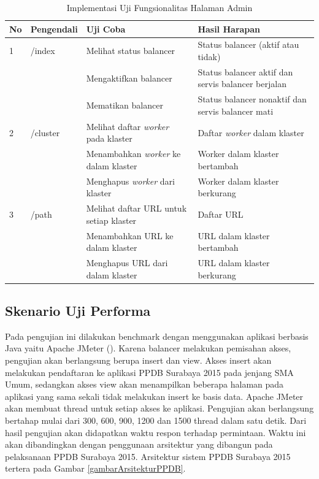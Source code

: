 \documentclass{ta-its}
\begin{document}
				\begin{longtable}{|p{}|p{}|p{}|p{}|} %
					
					\caption{Implementasi Uji Fungsionalitas Halaman Admin} \label{tabelUjiFungsionalitas} \\
					\hline
					\textbf{No} & \textbf{Pengendali} & \textbf{Uji Coba} & \textbf{Hasil Harapan} \\ \hline
					
					\endhead
					\endfoot
					\endlastfoot
					
					
					1 & /index & Melihat status balancer & Status balancer (aktif atau tidak) \\ \cline{3-4}
					&& Mengaktifkan	balancer & Status balancer aktif dan servis balancer berjalan \\ \cline{3-4}
					&& Mematikan balancer & Status balancer nonaktif dan servis balancer mati \\ \hline
					2 & /cluster & Melihat daftar \textit{worker} pada klaster & Daftar \textit{worker} dalam klaster \\ \cline{3-4}
					&& Menambahkan \textit{worker} ke dalam klaster & Worker dalam klaster bertambah \\ \cline{3-4}
					&& Menghapus \textit{worker} dari klaster & Worker dalam klaster berkurang \\ \hline
					3 & /path & Melihat daftar URL untuk setiap klaster & Daftar URL \\ \cline{3-4}
					&& Menambahkan URL ke dalam klaster & URL dalam klaster bertambah \\ \cline{3-4}
					&& Menghapus URL dari dalam klaster & URL dalam klaster berkurang \\ \hline
					
				\end{longtable}
			
			\subsection{Skenario Uji Performa}
				Pada pengujian ini dilakukan benchmark dengan menggunakan aplikasi berbasis Java yaitu Apache JMeter (). Karena balancer melakukan pemisahan akses, pengujian akan berlangsung berupa insert dan view. Akses insert akan melakukan pendaftaran ke aplikasi PPDB Surabaya 2015 pada jenjang SMA Umum, sedangkan akses view akan menampilkan beberapa halaman pada aplikasi yang sama sekali tidak melakukan insert ke basis data. Apache JMeter akan membuat thread untuk setiap akses ke aplikasi. Pengujian akan berlangsung bertahap mulai dari 300, 600, 900, 1200 dan 1500 thread dalam satu detik. Dari hasil pengujian akan didapatkan waktu respon terhadap permintaan. Waktu ini akan dibandingkan dengan penggunaan arsitektur yang dibangun pada pelaksanaan PPDB Surabaya 2015. Arsitektur sistem PPDB Surabaya 2015 tertera pada Gambar \ref{gambarArsitekturPPDB}.
		
\end{document}
